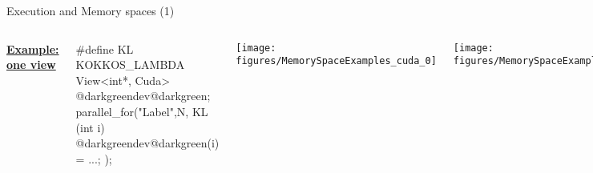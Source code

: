 \ifmedium
\begin{frame}[fragile]{Execution and Memory spaces (1)}

  \begin{columns}[t,onlytextwidth]

    \vspace{15pt}

    \ul{\textbf{Example: one view}}

    \vspace{5pt}

    \begin{code}[keywords={}]
#define KL KOKKOS_LAMBDA
View<int*, Cuda> @darkgreendev@darkgreen;
parallel_for("Label",N,
  KL (int i) {
    @darkgreendev@darkgreen(i) = ...;
  });
    \end{code}


      \begin{center}
        \texttt{[image: figures/MemorySpaceExamples\_cuda\_0]}
      \end{center}
      \begin{center}
        \texttt{[image: figures/MemorySpaceExamples\_cuda\_1]}
      \end{center}

  \end{columns}

\end{frame}
\fi


